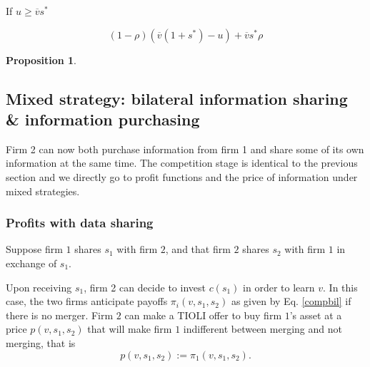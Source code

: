 \documentclass[a4paper,leqno]{article}%
\newtheorem{prop}{Proposition}
\newcommand{\ov}{\overline{v}}
\begin{document}
\medskip

If $u\geq \ov s^*$ 

\[
(1-\rho) (\ov (1+s^*)-u)+\ov s^*\rho
\]

\medskip

\begin{prop}~~


\end{prop}

\medskip

\subsection{Mixed strategy: bilateral information sharing \& information purchasing}

Firm 2 can now both purchase information from firm 1 and share some of its own information at the same time. The competition stage is identical to the previous section and we directly go to profit functions and the price of information under mixed strategies. 

\medskip

\subsubsection{Profits with data sharing}

Suppose firm $1$ shares $s_1$ with firm $2$, and that firm $2$ shares $s_2$ with firm $1$ in exchange of $s_1$. 

Upon receiving $s_1$, firm 2 can decide to invest $c(s_1)$ in order to learn $v$. In this case, the two firms anticipate payoffs $\pi_i(v,s_1,s_2)$ as given by Eq. \eqref{compbil} if there is no merger. Firm $2$ can make a TIOLI offer to buy firm $1$'s asset at a price $p(v,s_1,s_2)$ that will make firm $1$ indifferent between merging and not merging, that is 
%
\begin{equation}\label{merger-pricebil2}
    p(v,s_1,s_2):=\pi_1(v,s_1,s_2).  
\end{equation}
%
\end{document}
